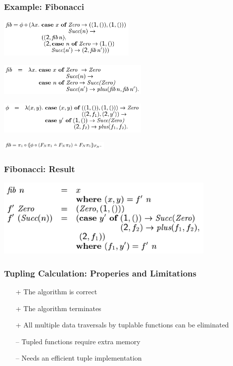 \documentclass{beamer}
\begin{document}
\begin{frame}[fragile]
  \frametitle{Example: Fibonacci}
\includegraphics[width=0.5\textwidth]{fibPhi.png}

\vspace{0.3cm}

\includegraphics[width=0.55\textwidth]{fibRed.png}

\vspace{0.3cm}

\includegraphics[width=0.55\textwidth]{phi.png}

\vspace{0.3cm}

\includegraphics[width=0.4\textwidth]{fibFinal.png}
\end{frame}

\begin{frame}[fragile]
  \frametitle{Fibonacci: Result}
\includegraphics[width=0.8\textwidth]{fibResult.png}
\end{frame}

\begin{frame}[fragile]
  \frametitle{Tupling Calculation: Properies and Limitations}
\begin{itemize}
  \item[+] The algorithm is correct
  \item[+] The algorithm terminates
  \item[+] All multiple data traversals by tuplable functions can be eliminated
  \item[--] Tupled functions require extra memory
  \item[--] Needs an efficient tuple implementation
\end{itemize}
\end{frame}
\end{document}
